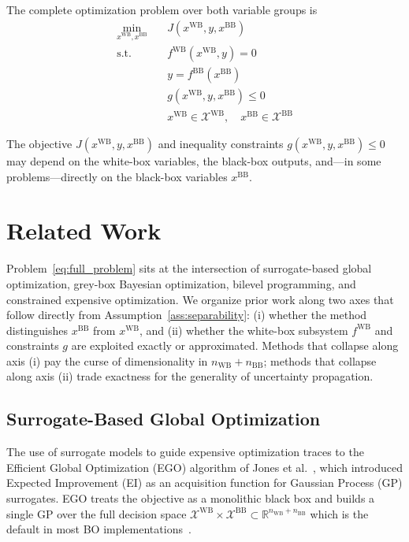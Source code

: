 \documentclass[12pt,a4paper]{article}%
\theoremstyle{plain}%
\theoremstyle{remark}%
\theoremstyle{definition}%
\def\WB{\mathrm{WB}}
\def\BB{\mathrm{BB}}
\begin{document}
The complete optimization problem over both variable groups is
\begin{subequations}\label{eq:full_problem}
\begin{align}
    \min_{x^{\WB}, x^{\BB}} \quad & J(x^{\WB}, y, x^{\BB}) \label{eq:objective}\\
    \text{s.t.} \quad & f^{\WB}(x^{\WB}, y) = 0 \label{eq:process_constraint}\\
    & y = f^{\BB}(x^{\BB}) \label{eq:material_constraint}\\
    & g(x^{\WB}, y, x^{\BB}) \leq 0 \label{eq:inequality_constraints}\\
    & x^{\WB} \in \mathcal{X}^{\WB}, \quad x^{\BB} \in \mathcal{X}^{\BB} \label{eq:bounds}
\end{align}
\end{subequations}

The objective $J(x^{\WB}, y, x^{\BB})$ and inequality constraints $g(x^{\WB}, y, x^{\BB}) \leq 0$ may depend on the white-box variables, the black-box outputs, and---in some problems---directly on the black-box variables $x^{\BB}$.

\section{Related Work}\label{sec:related_work}

Problem~\eqref{eq:full_problem} sits at the intersection of surrogate-based global optimization, grey-box Bayesian optimization, bilevel programming, and constrained expensive optimization. We organize prior work along two axes that follow directly from Assumption~\ref{ass:separability}: (i) whether the method distinguishes $x^{\BB}$ from $x^{\WB}$, and (ii) whether the white-box subsystem $f^{\WB}$ and constraints $g$ are exploited exactly or approximated. Methods that collapse along axis (i) pay the curse of dimensionality in $n_{\WB}+n_{\BB}$; methods that collapse along axis (ii) trade exactness for the generality of uncertainty propagation.

\subsection{Surrogate-Based Global Optimization}

The use of surrogate models to guide expensive optimization traces to the Efficient Global Optimization (EGO) algorithm of Jones et al.~\cite{jones1998efficient}, which introduced Expected Improvement (EI) as an acquisition function for Gaussian Process (GP) surrogates. EGO treats the objective as a monolithic black box and builds a single GP over the full decision space $\mathcal{X}^{\WB}\times\mathcal{X}^{\BB}\subset\mathbb{R}^{n_{\WB}+n_{\BB}}$ which is the default in most BO implementations~\cite{shahriari2016bo_survey,frazier2018tutorial}.
\end{document}
